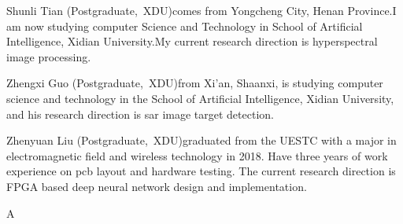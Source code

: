 \documentclass[lettersize,journal]{IEEEtran}
\begin{document}
\begin{IEEEbiography}{Shunli Tian}
	(Postgraduate,~XDU)comes from Yongcheng City, Henan Province.I am now studying computer Science and Technology in School of Artificial Intelligence, Xidian University.My current research direction is hyperspectral image processing.\end{IEEEbiography}

\begin{IEEEbiography}{Zhengxi Guo}
	(Postgraduate,~XDU)from Xi'an, Shaanxi, is studying computer science and technology in the School of Artificial Intelligence, Xidian University, and his research direction is sar image target detection.\end{IEEEbiography}

\begin{IEEEbiography}{Zhenyuan Liu}
	(Postgraduate,~XDU)graduated from the UESTC with a major in electromagnetic field and wireless technology in 2018. Have three years of work experience on pcb layout and hardware testing. The current research direction is FPGA based deep neural network design and implementation.\end{IEEEbiography}A
\end{document}
